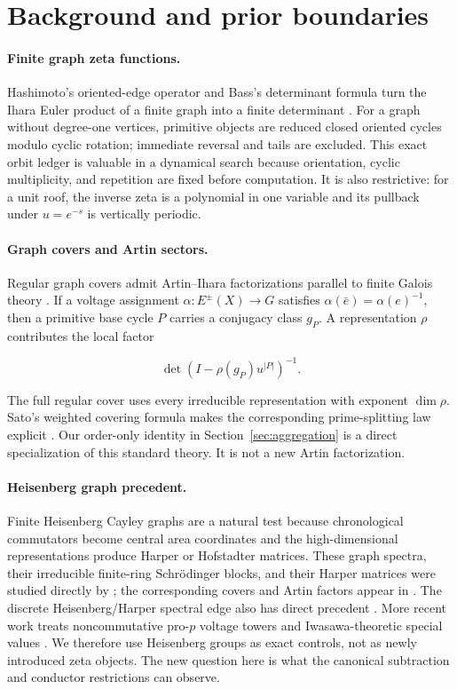 \section{Background and prior boundaries}
\label{sec:background}

\paragraph{Finite graph zeta functions.}
Hashimoto's oriented-edge operator and Bass's determinant formula turn the
Ihara Euler product of a finite graph into a finite determinant
\citep{hashimoto1990zeta,bass1992ihara}. For a graph without degree-one
vertices, primitive objects are reduced closed oriented cycles modulo cyclic
rotation; immediate reversal and tails are excluded. This exact orbit ledger
is valuable in a dynamical search because orientation, cyclic multiplicity,
and repetition are fixed before computation. It is also restrictive: for a
unit roof, the inverse zeta is a polynomial in one variable and its pullback
under \(u=e^{-s}\) is vertically periodic.

\paragraph{Graph covers and Artin sectors.}
Regular graph covers admit Artin--Ihara factorizations parallel to finite
Galois theory \citep{stark1996finite,stark2000partii}. If a voltage
assignment \(\alpha:E^\pm(X)\to G\) satisfies
\(\alpha(\bar e)=\alpha(e)^{-1}\), then a primitive base cycle \(P\) carries
a conjugacy class \(g_P\). A representation \(\rho\) contributes the local
factor

\[
\det(I-\rho(g_P)u^{|P|})^{-1}.
\]

The full regular cover uses every irreducible representation with exponent
\(\dim\rho\). Sato's weighted covering formula makes the corresponding
prime-splitting law explicit \citep{sato2006weighted}. Our order-only
identity in Section~\ref{sec:aggregation} is a direct specialization of this
standard theory. It is not a new Artin factorization.

\paragraph{Heisenberg graph precedent.}
Finite Heisenberg Cayley graphs are a natural test because chronological
commutators become central area coordinates and the high-dimensional
representations produce Harper or Hofstadter matrices. These graph spectra,
their irreducible finite-ring Schrödinger blocks, and their Harper matrices
were studied directly by \citet{dedeo2003spectra}; the corresponding covers
and Artin factors appear in \citet{dedeo2005heisenberg}. The discrete
Heisenberg/Harper spectral edge also has direct precedent
\citep{beguin1997harper}. More recent work treats noncommutative
pro-\(p\) voltage towers and Iwasawa-theoretic special values
\citep{kleine2026iwasawa}. We therefore use Heisenberg groups as exact
controls, not as newly introduced zeta objects. The new question here is what
the canonical subtraction and conductor restrictions can observe.

